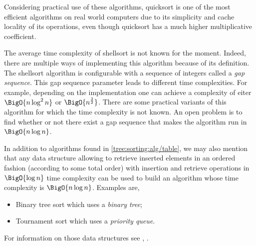 Considering practical use of these algorithms, quicksort is one of the most efficient algorithms on real world computers due to its simplicity and cache locality of its operations, even though quicksort has a much higher multiplicative coefficient.

The average time complexity of shellsort is not known for the moment. Indeed, there are multiple ways of implementing this algorithm because of its definition. The shellsort algorithm is configurable with a sequence of integers called a \emph{gap sequence}. This gap sequence parameter leads to different time complexities. For example, depending on the implementation one can achieve a complexity of eiter $\BigO{n \log^2 n}$ or $\BigO{n^{\frac{3}{2}}}$. There are some practical variants of this algorithm for which the time complexity is not known. An open problem is to find whether or not there exist a gap sequence that makes the algorithm run in $\BigO{n \log n}$.

In addition to algorithms found in \ref{tree:sorting:alg/table}, we may also mention that any data structure allowing to retrieve inserted elements in an ordered fashion (according to some total order) with insertion and retrieve operations in $\BigO{\log n}$ time complexity can be used to build an algorithm whose time complexity is $\BigO{n \log n}$. Examples are,

\begin{itemize}
\item Binary tree sort which uses a \emph{binary tree};
\item Tournament sort which uses a \emph{priority queue}.
\end{itemize}

For information on those data structures see \cite{sleator1985self}, \cite{leiserson2001introduction}.
